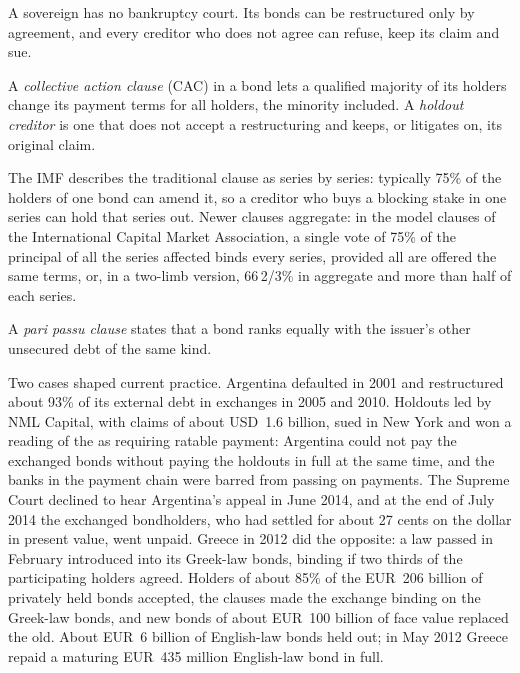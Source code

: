 A sovereign has no bankruptcy court. Its bonds can be restructured only by agreement,
and every creditor who does not agree can refuse, keep its claim and sue.

\begin{definition}\label{def:m2:distressed-sovereign-and-bank-capital-credit:cac}
A \emph{collective action clause} (CAC) in a bond lets a
qualified majority of its holders change its payment terms for all holders, the
minority included. A \emph{holdout creditor} is one that does
not accept a restructuring and keeps, or litigates on, its original claim.
\end{definition}

The IMF describes the traditional clause as series by series: typically 75\% of the
holders of one bond can amend it, so a creditor who buys a blocking stake in one series
can hold that series out. Newer clauses aggregate: in the model clauses of the
International Capital Market Association, a single vote of 75\% of the principal of all
the series affected binds every series, provided all are offered the same terms, or,
in a two-limb version, 66\,2/3\% in aggregate and more than half of each series.

\begin{definition}\label{def:m2:distressed-sovereign-and-bank-capital-credit:pp}
A \emph{pari passu clause} states that a bond ranks equally
with the issuer's other unsecured debt of the same kind.
\end{definition}

Two cases shaped current practice. Argentina defaulted in 2001 and restructured about
93\% of its external debt in exchanges in 2005 and 2010. Holdouts led by NML Capital,
with claims of about USD~1.6 billion, sued in New York and won a reading of the  as requiring ratable payment: Argentina could not pay the exchanged bonds
without paying the holdouts in full at the same time, and the banks in the payment chain
were barred from passing on payments. The Supreme Court declined to hear Argentina's
appeal in June 2014, and at the end of July 2014 the exchanged bondholders, who had
settled for about 27 cents on the dollar in present value, went unpaid. Greece in 2012
did the opposite: a law passed in February introduced  into
its Greek-law bonds, binding if two thirds of the participating holders agreed. Holders
of about 85\% of the EUR~206 billion of privately held bonds accepted, the clauses
made the exchange binding on the Greek-law bonds, and new bonds of about EUR~100 billion
of face value replaced the old. About EUR~6 billion of English-law bonds held out; in
May 2012 Greece repaid a maturing EUR~435 million English-law bond in full.


